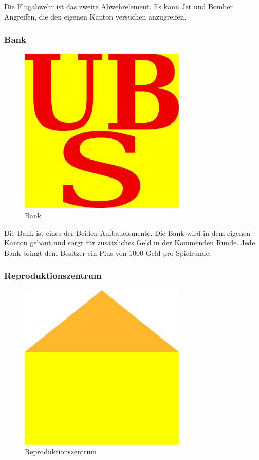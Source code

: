 \documentclass[ngerman, 12pt, pdftex]{scrartcl}[2006/07/30]
\begin{document}
Die Flugabwehr ist das zweite Abwehrelement. Es kann Jet und Bomber Angreifen, die den eigenen Kanton versuchen anzugreifen.


\subsubsection{Bank}

\begin{figure}[h]
\centering
\includegraphics[scale=1.8]{spiel/Bank.png}
\caption{Bank}
\end{figure}

Die Bank ist eines der Beiden Aufbauelemente. Die Bank wird in dem eigenen Kanton gebaut und sorgt für zusätzliches Geld in der Kommenden Runde. Jede Bank bringt dem Besitzer ein Plus von 1000 Geld pro Spielrunde.

\newpage

\subsubsection{Reproduktionszentrum}

\begin{figure}[h]
\centering
\includegraphics[scale=2]{spiel/Repro.png}
\caption{Reproduktionszentrum}
\end{figure}
\end{document}

